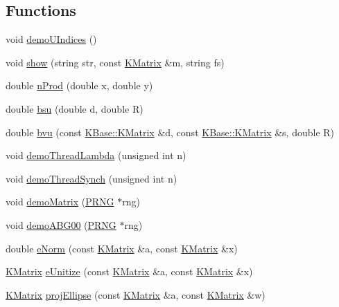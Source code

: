 \subsection*{Functions}
\begin{DoxyCompactItemize}
\item 
void \hyperlink{namespace_u_demo_af036e0d72ce00f43501ab715da863a4c}{demo\-U\-Indices} ()
\item 
void \hyperlink{namespace_u_demo_ab912c929299cd2f09754a66e3d90ec80}{show} (string str, const \hyperlink{class_k_base_1_1_k_matrix}{K\-Matrix} \&m, string fs)
\item 
double \hyperlink{namespace_u_demo_a0d1cb45c4d8e79328f33113c19dace5e}{n\-Prod} (double x, double y)
\item 
double \hyperlink{namespace_u_demo_a825280bfab7e5c54751854c878171800}{bsu} (double d, double R)
\item 
double \hyperlink{namespace_u_demo_a24fa9e8edc7d6e69e67036c43636ea57}{bvu} (const \hyperlink{class_k_base_1_1_k_matrix}{K\-Base\-::\-K\-Matrix} \&d, const \hyperlink{class_k_base_1_1_k_matrix}{K\-Base\-::\-K\-Matrix} \&s, double R)
\item 
void \hyperlink{namespace_u_demo_afab40e679b7464597a3f16bb3b3ad569}{demo\-Thread\-Lambda} (unsigned int n)
\item 
void \hyperlink{namespace_u_demo_a9519c38d4ad99889f39cecf755313461}{demo\-Thread\-Synch} (unsigned int n)
\item 
void \hyperlink{namespace_u_demo_ac82c8f8716c76ad48853ad825be8a7b1}{demo\-Matrix} (\hyperlink{class_k_base_1_1_p_r_n_g}{P\-R\-N\-G} $\ast$rng)
\item 
void \hyperlink{namespace_u_demo_a0543289dc0db3bfbb861239ab789944b}{demo\-A\-B\-G00} (\hyperlink{class_k_base_1_1_p_r_n_g}{P\-R\-N\-G} $\ast$rng)
\item 
double \hyperlink{namespace_u_demo_abdf3ddd4d695ea258e680a89e5178559}{e\-Norm} (const \hyperlink{class_k_base_1_1_k_matrix}{K\-Matrix} \&a, const \hyperlink{class_k_base_1_1_k_matrix}{K\-Matrix} \&x)
\item 
\hyperlink{class_k_base_1_1_k_matrix}{K\-Matrix} \hyperlink{namespace_u_demo_a6bc7be42e97e2b47c94aeded0af38082}{e\-Unitize} (const \hyperlink{class_k_base_1_1_k_matrix}{K\-Matrix} \&a, const \hyperlink{class_k_base_1_1_k_matrix}{K\-Matrix} \&x)
\item 
\hyperlink{class_k_base_1_1_k_matrix}{K\-Matrix} \hyperlink{namespace_u_demo_a1606b4991fe9c06c2cc5c668850fbcd7}{proj\-Ellipse} (const \hyperlink{class_k_base_1_1_k_matrix}{K\-Matrix} \&a, const \hyperlink{class_k_base_1_1_k_matrix}{K\-Matrix} \&w)

\end{DoxyCompactItemize}
